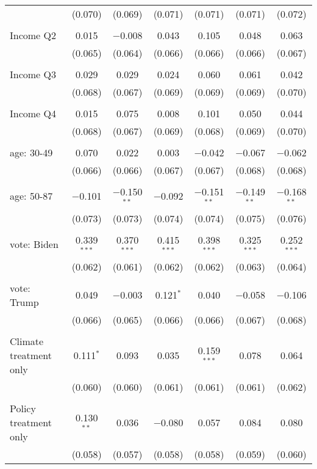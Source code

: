 \begin{tabular}{@{\extracolsep{5pt}}lcccccc}
  & (0.070) & (0.069) & (0.071) & (0.071) & (0.071) & (0.072) \\ 
  & & & & & & \\ 
 Income Q2 & 0.015 & $-$0.008 & 0.043 & 0.105 & 0.048 & 0.063 \\ 
  & (0.065) & (0.064) & (0.066) & (0.066) & (0.066) & (0.067) \\ 
  & & & & & & \\ 
 Income Q3 & 0.029 & 0.029 & 0.024 & 0.060 & 0.061 & 0.042 \\ 
  & (0.068) & (0.067) & (0.069) & (0.069) & (0.069) & (0.070) \\ 
  & & & & & & \\ 
 Income Q4 & 0.015 & 0.075 & 0.008 & 0.101 & 0.050 & 0.044 \\ 
  & (0.068) & (0.067) & (0.069) & (0.068) & (0.069) & (0.070) \\ 
  & & & & & & \\ 
 age: 30-49 & 0.070 & 0.022 & 0.003 & $-$0.042 & $-$0.067 & $-$0.062 \\ 
  & (0.066) & (0.066) & (0.067) & (0.067) & (0.068) & (0.068) \\ 
  & & & & & & \\ 
 age: 50-87 & $-$0.101 & $-$0.150$^{**}$ & $-$0.092 & $-$0.151$^{**}$ & $-$0.149$^{**}$ & $-$0.168$^{**}$ \\ 
  & (0.073) & (0.073) & (0.074) & (0.074) & (0.075) & (0.076) \\ 
  & & & & & & \\ 
 vote: Biden & 0.339$^{***}$ & 0.370$^{***}$ & 0.415$^{***}$ & 0.398$^{***}$ & 0.325$^{***}$ & 0.252$^{***}$ \\ 
  & (0.062) & (0.061) & (0.062) & (0.062) & (0.063) & (0.064) \\ 
  & & & & & & \\ 
 vote: Trump & 0.049 & $-$0.003 & 0.121$^{*}$ & 0.040 & $-$0.058 & $-$0.106 \\ 
  & (0.066) & (0.065) & (0.066) & (0.066) & (0.067) & (0.068) \\ 
  & & & & & & \\ 
 Climate treatment only & 0.111$^{*}$ & 0.093 & 0.035 & 0.159$^{***}$ & 0.078 & 0.064 \\ 
  & (0.060) & (0.060) & (0.061) & (0.061) & (0.061) & (0.062) \\ 
  & & & & & & \\ 
 Policy treatment only & 0.130$^{**}$ & 0.036 & $-$0.080 & 0.057 & 0.084 & 0.080 \\ 
  & (0.058) & (0.057) & (0.058) & (0.058) & (0.059) & (0.060) \\ 

\end{tabular}
